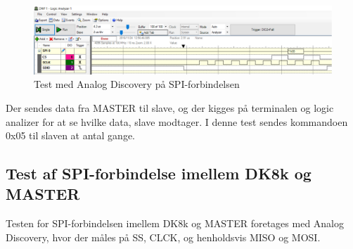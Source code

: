 \begin{figure}[H]
	\centering
\includegraphics[scale=0.5]{Screenshots/Logic_analyzer}
\caption{Test med Analog Discovery på SPI-forbindelsen}
\end{figure}

Der sendes data fra MASTER til slave, og der kigges på terminalen og logic analizer for at se hvilke data, slave modtager. I denne test sendes kommandoen 0x05 til 
slaven at antal gange.

\subsection{Test af SPI-forbindelse imellem DK8k og MASTER}

Testen for SPI-forbindelsen imellem DK8k og MASTER foretages med Analog Discovery, hvor der måles på SS, CLCK, og henholdsvis MISO og MOSI.

